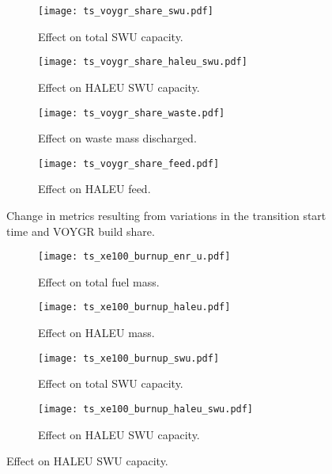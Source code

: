 \begin{figure}
    \ContinuedFloat
    \begin{subfigure}[b]{0.48\textwidth}
        \centering
        \texttt{[image: ts\_voygr\_share\_swu.pdf]}
        \caption{Effect on total SWU capacity.}
        \label{fig:ts_voygr_share_swu}
    \end{subfigure}
    \hfill
    \begin{subfigure}[b]{0.48\textwidth}
        \centering
        \texttt{[image: ts\_voygr\_share\_haleu\_swu.pdf]}
        \caption{Effect on HALEU SWU capacity.}
        \label{fig:ts_voygr_share_haleu_swu}
    \end{subfigure}
    
    \begin{subfigure}[b]{0.48\textwidth}
        \centering
        \texttt{[image: ts\_voygr\_share\_waste.pdf]}
        \caption{Effect on waste mass discharged.}
        \label{fig:ts_voygr_share_waste}
    \end{subfigure}
    \hfill
    \begin{subfigure}[b]{0.48\textwidth}
        \centering
        \texttt{[image: ts\_voygr\_share\_feed.pdf]}
        \caption{Effect on HALEU feed.}
        \label{fig:ts_voygr_share_feed}
    \end{subfigure}
    \caption{Change in metrics resulting from variations in the 
    transition start time and VOYGR build share.}
    \label{fig:ts_voygr_share}
\end{figure}
\begin{figure}
    \begin{subfigure}[b]{0.48\textwidth}
        \centering
        \texttt{[image: ts\_xe100\_burnup\_enr\_u.pdf]}
        \caption{Effect on total fuel mass.}
        \label{fig:ts_xe100_bu_enr_u}
    \end{subfigure}
    \hfill
    \begin{subfigure}[b]{0.48\textwidth}
        \centering
        \texttt{[image: ts\_xe100\_burnup\_haleu.pdf]}
        \caption{Effect on HALEU mass.}
        \label{fig:ts_xe100_bu_haleu}
    \end{subfigure}
    
    \begin{subfigure}[b]{0.48\textwidth}
        \centering
        \texttt{[image: ts\_xe100\_burnup\_swu.pdf]}
        \caption{Effect on total SWU capacity.}
        \label{fig:ts_xe100_bu_swu}
    \end{subfigure}
    \hfill
    \begin{subfigure}[b]{0.48\textwidth}
        \centering
        \texttt{[image: ts\_xe100\_burnup\_haleu\_swu.pdf]}
        \caption{Effect on HALEU SWU capacity.}
        \label{fig:ts_xe100_bu_haleu_swu}
    \end{subfigure}
\end{figure}

